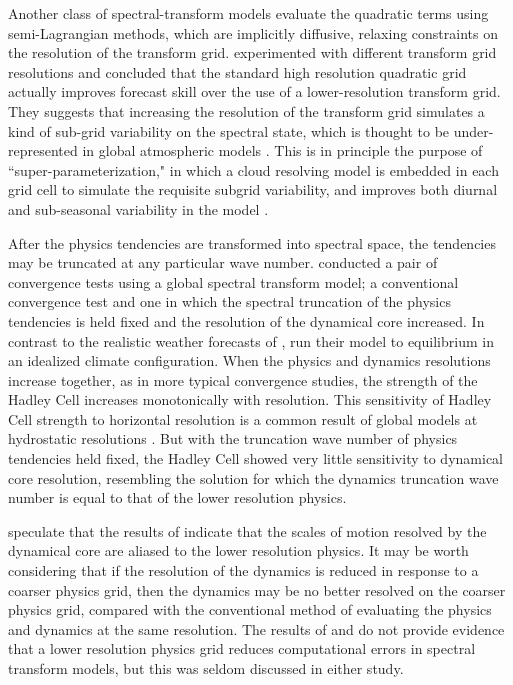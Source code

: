 \documentclass{agujournal}
\begin{document}
Another class of spectral-transform models evaluate the quadratic terms using semi-Lagrangian methods, which are implicitly diffusive, relaxing constraints on the resolution of the transform grid. \cite{W2014PTRSL} experimented with different transform grid resolutions and concluded that the standard high resolution quadratic grid actually improves forecast skill over the use of a lower-resolution transform grid. They suggests that increasing the resolution of the transform grid simulates a kind of sub-grid variability on the spectral state, which is thought to be under-represented in global atmospheric models \citep{S2005QJR}. This is in principle the purpose of ``super-parameterization," in which a cloud resolving model is embedded in each grid cell to simulate the requisite subgrid variability, and improves both diurnal and sub-seasonal variability in the model \citep{RKAG2003BAMS}.

After the physics tendencies are transformed into spectral space, the tendencies may be truncated at any particular wave number. \cite{W1999T} conducted a pair of convergence tests using a global spectral transform model; a conventional convergence test and one in which the spectral truncation of the physics tendencies is held fixed and the resolution of the dynamical core increased. In contrast to the realistic weather forecasts of \cite{W2014PTRSL}, \cite{W1999T} run their model to equilibrium in an idealized climate configuration. When the physics and dynamics resolutions increase together, as in more typical convergence studies, the strength of the Hadley Cell increases monotonically with resolution. This sensitivity of Hadley Cell strength to horizontal resolution is a common result of global models at hydrostatic resolutions \citep[see][and references therein]{HR2017JCLIM}. But with the truncation wave number of physics tendencies held fixed, the Hadley Cell showed very little sensitivity to dynamical core resolution, resembling the solution for which the dynamics truncation wave number is equal to that of the lower resolution physics. 

\cite{HR2017JCLIM} speculate that the results of \cite{W1999T} indicate that the scales of motion resolved by the dynamical core are aliased to the lower resolution physics. It may be worth considering that if the resolution of the dynamics is reduced in response to a coarser physics grid, then the dynamics may be no better resolved on the coarser physics grid, compared with the conventional method of evaluating the physics and dynamics at the same resolution. The results of \cite{W1999T} and \cite{W2014PTRSL} do not provide evidence that a lower resolution physics grid reduces computational errors in spectral transform models, but this was seldom discussed in either study.  
\end{document}
